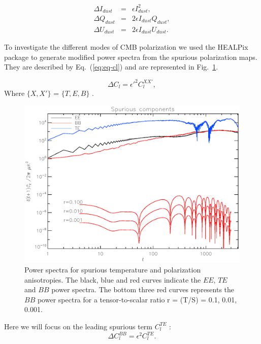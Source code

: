 \begin{eqnarray}
\label{eq:spurious-mapI}
\Delta I_{dust}  &=& \epsilon I_{dust}^{2},\\
\label{eq:spurious-mapQ}
\Delta Q_{dust}  &=& 2\epsilon I_{dust}Q_{dust},\\
\label{eq:spurious-mapU}
\Delta U_{dust} &=& 2 \epsilon I_{dust}U_{dust}.
\end{eqnarray}

To investigate the different modes of CMB polarization we used the HEALPix package \citep{2005ApJ...622..759G} to generate modified power spectra from the spurious polarization maps. They are described by Eq.~(\ref{eq:eq-cl}) and are represented in Fig.~\ref{fig:cl2}.

\begin{equation}
\Delta C_{l} = \epsilon'^{2} C_{l}^{XX'},
\label{eq:eq-cl}
\end{equation}
Where $\lbrace X,X' \rbrace$ = $\lbrace T,E,B \rbrace$ .\\

\begin{figure}[h]
\center
	\includegraphics[scale=0.5]{Figures/cl2_spurious.eps}
	\caption{Power spectra for spurious temperature and polarization anisotropies. The black, blue and red curves indicate the $EE$, $TE$ and $BB$ power spectra. The bottom three red curves represents the $BB$ power spectra for a tensor-to-scalar ratio r = (T/S) = 0.1, 0.01, 0.001.}
	\label{fig:cl2}
\end{figure}

Here we will focus on the leading spurious term $C_{l}^{TE}$ : 
\begin{equation}
\Delta C_{l}^{BB} = \epsilon^{2} C_{l}^{TE}.
\label{eq:eq-cl2}
\end{equation}

